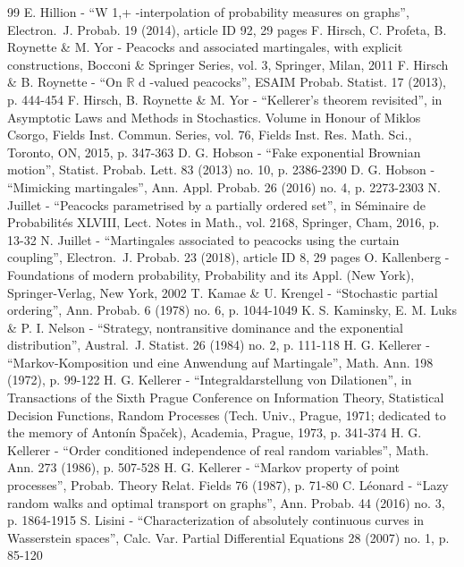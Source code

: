 \documentclass[10pt,a4paper]{article}
\theoremstyle{plain}
\theoremstyle{definition}
\begin{document}
\begin{thebibliography}{99}
 E. Hillion - “W 1,+ -interpolation of probability measures on graphs”, Electron. J. Probab. 19 (2014), article ID 92, 29 pages
 F. Hirsch, C. Profeta, B. Roynette \& M. Yor - Peacocks and associated martingales, with explicit constructions, Bocconi \& Springer Series, vol. 3, Springer, Milan, 2011
 F. Hirsch \& B. Roynette - “On \ensuremath{\mathbb{R}} d -valued peacocks”, ESAIM Probab. Statist. 17 (2013), p. 444-454
 F. Hirsch, B. Roynette \& M. Yor - “Kellerer’s theorem revisited”, in Asymptotic Laws and Methods in Stochastics. Volume in Honour of Miklos Csorgo, Fields Inst. Commun. Series, vol. 76, Fields Inst. Res. Math. Sci., Toronto, ON, 2015, p. 347-363
 D. G. Hobson - “Fake exponential Brownian motion”, Statist. Probab. Lett. 83 (2013) no. 10, p. 2386-2390
 D. G. Hobson - “Mimicking martingales”, Ann. Appl. Probab. 26 (2016) no. 4, p. 2273-2303
 N. Juillet - “Peacocks parametrised by a partially ordered set”, in Séminaire de Probabilités XLVIII, Lect. Notes in Math., vol. 2168, Springer, Cham, 2016, p. 13-32
 N. Juillet - “Martingales associated to peacocks using the curtain coupling”, Electron. J. Probab. 23 (2018), article ID 8, 29 pages
 O. Kallenberg - Foundations of modern probability, Probability and its Appl. (New York), Springer-Verlag, New York, 2002
 T. Kamae \& U. Krengel - “Stochastic partial ordering”, Ann. Probab. 6 (1978) no. 6, p. 1044-1049
 K. S. Kaminsky, E. M. Luks \& P. I. Nelson - “Strategy, nontransitive dominance and the exponential distribution”, Austral. J. Statist. 26 (1984) no. 2, p. 111-118
 H. G. Kellerer - “Markov-Komposition und eine Anwendung auf Martingale”, Math. Ann. 198 (1972), p. 99-122
 H. G. Kellerer - “Integraldarstellung von Dilationen”, in Transactions of the Sixth Prague Conference on Information Theory, Statistical Decision Functions, Random Processes (Tech. Univ., Prague, 1971; dedicated to the memory of Antonín Špaček), Academia, Prague, 1973, p. 341-374
 H. G. Kellerer - “Order conditioned independence of real random variables”, Math. Ann. 273 (1986), p. 507-528
 H. G. Kellerer - “Markov property of point processes”, Probab. Theory Relat. Fields 76 (1987), p. 71-80
 C. Léonard - “Lazy random walks and optimal transport on graphs”, Ann. Probab. 44 (2016) no. 3, p. 1864-1915
 S. Lisini - “Characterization of absolutely continuous curves in Wasserstein spaces”, Calc. Var. Partial Differential Equations 28 (2007) no. 1, p. 85-120

\end{thebibliography}
\end{document}

